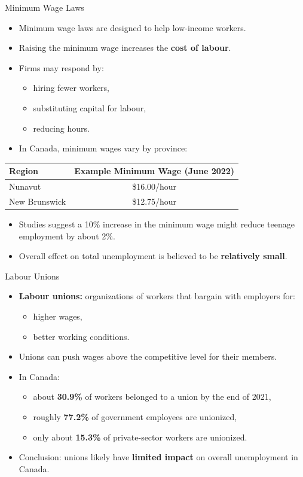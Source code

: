 \documentclass[aspectratio=169]{beamer}
\begin{document}
\begin{frame}{Minimum Wage Laws}
\transfade
\begin{itemize}[<+->]
  \item Minimum wage laws are designed to help low-income workers.
  \item Raising the minimum wage increases the \textbf{cost of labour}.
  \item Firms may respond by:
  \begin{itemize}[<+->]
    \item hiring fewer workers,
    \item substituting capital for labour,
    \item reducing hours.
  \end{itemize}
  \item In Canada, minimum wages vary by province:
\end{itemize}
\small
\begin{tabular}{l c}
\toprule
Region & Example Minimum Wage (June 2022) \\
\midrule
Nunavut & \$16.00/hour \\
New Brunswick & \$12.75/hour \\
\bottomrule
\end{tabular}

\vspace{0.4em}
\begin{itemize}[<+->]
  \item Studies suggest a 10\% increase in the minimum wage might reduce teenage employment by about 2\%.
  \item Overall effect on total unemployment is believed to be \textbf{relatively small}.
\end{itemize}
\end{frame}

\begin{frame}{Labour Unions}
\transfade
\begin{itemize}[<+->]
  \item \textbf{Labour unions:} organizations of workers that bargain with employers for:
  \begin{itemize}[<+->]
    \item higher wages,
    \item better working conditions.
  \end{itemize}
  \item Unions can push wages above the competitive level for their members.
  \item In Canada:
  \begin{itemize}[<+->]
    \item about \textbf{30.9\%} of workers belonged to a union by the end of 2021,
    \item roughly \textbf{77.2\%} of government employees are unionized,
    \item only about \textbf{15.3\%} of private-sector workers are unionized.
  \end{itemize}
  \item Conclusion: unions likely have \textbf{limited impact} on overall unemployment in Canada.
\end{itemize}
\end{frame}
\end{document}
